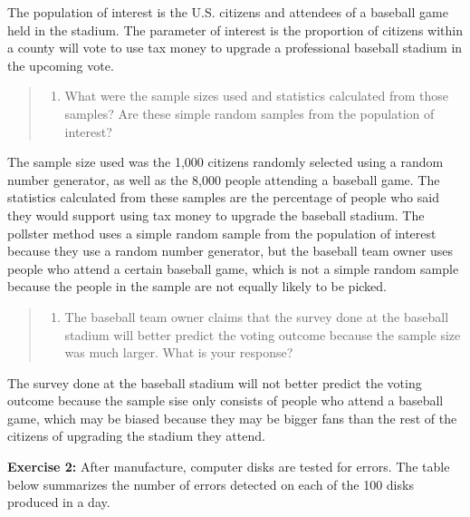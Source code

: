 \documentclass[
]{article}
\providecommand{\tightlist}{%
  \setlength{\itemsep}{0pt}\setlength{\parskip}{0pt}}
\begin{document}
The population of interest is the U.S. citizens and attendees of a
baseball game held in the stadium. The parameter of interest is the
proportion of citizens within a county will vote to use tax money to
upgrade a professional baseball stadium in the upcoming vote.

\begin{quote}
\begin{enumerate}
\def\labelenumi{\alph{enumi}.}
\setcounter{enumi}{1}
\tightlist
\item
  What were the sample sizes used and statistics calculated from those
  samples? Are these simple random samples from the population of
  interest?
\end{enumerate}
\end{quote}

The sample size used was the 1,000 citizens randomly selected using a
random number generator, as well as the 8,000 people attending a
baseball game. The statistics calculated from these samples are the
percentage of people who said they would support using tax money to
upgrade the baseball stadium. The pollster method uses a simple random
sample from the population of interest because they use a random number
generator, but the baseball team owner uses people who attend a certain
baseball game, which is not a simple random sample because the people in
the sample are not equally likely to be picked.

\begin{quote}
\begin{enumerate}
\def\labelenumi{\alph{enumi}.}
\setcounter{enumi}{2}
\tightlist
\item
  The baseball team owner claims that the survey done at the baseball
  stadium will better predict the voting outcome because the sample size
  was much larger. What is your response?
\end{enumerate}
\end{quote}

The survey done at the baseball stadium will not better predict the
voting outcome because the sample sise only consists of people who
attend a baseball game, which may be biased because they may be bigger
fans than the rest of the citizens of upgrading the stadium they attend.

\vspace{1cm}

\newpage

\textbf{Exercise 2:} After manufacture, computer disks are tested for
errors. The table below summarizes the number of errors detected on each
of the 100 disks produced in a day.
\end{document}
